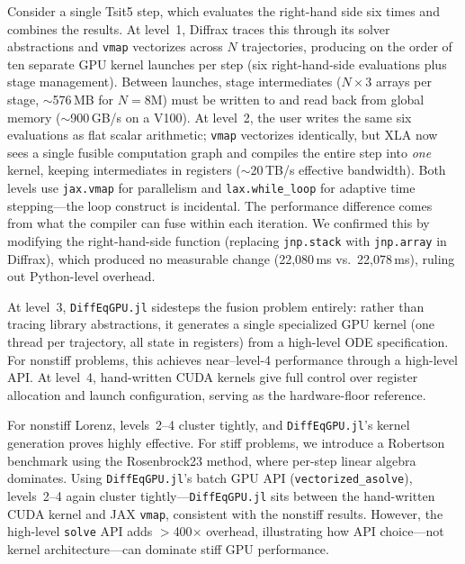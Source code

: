 \documentclass[11pt]{article}
\begin{document}
Consider a single Tsit5 step, which evaluates the right-hand side
six times and combines the results.
At level~1, Diffrax traces this through its solver abstractions
and \texttt{vmap} vectorizes across $N$ trajectories, producing
on the order of ten separate GPU kernel launches per step
(six right-hand-side evaluations plus stage management).
Between launches, stage intermediates ($N \times 3$ arrays per
stage, ${\sim}$576\,MB for $N = 8\text{M}$) must be written to
and read back from global memory (${\sim}$900\,GB/s on a V100).
At level~2, the user writes the same six evaluations as flat
scalar arithmetic; \texttt{vmap} vectorizes identically, but XLA
now sees a single fusible computation graph and compiles the
entire step into \emph{one} kernel, keeping intermediates in
registers (${\sim}$20\,TB/s effective bandwidth).
Both levels use \texttt{jax.vmap} for parallelism and
\texttt{lax.while\_loop} for adaptive time stepping---the loop
construct is incidental.
The performance difference comes from what the compiler can fuse
within each iteration.
We confirmed this by modifying the right-hand-side function
(replacing \texttt{jnp.stack} with \texttt{jnp.array} in Diffrax),
which produced no measurable change (22{,}080\,ms vs.\
22{,}078\,ms), ruling out Python-level overhead.

At level~3, \texttt{DiffEqGPU.jl} sidesteps the fusion problem
entirely: rather than tracing library abstractions, it generates a
single specialized GPU kernel (one thread per trajectory, all
state in registers) from a high-level ODE specification.
For nonstiff problems, this achieves near--level-4 performance
through a high-level API.
At level~4, hand-written CUDA kernels give full control over
register allocation and launch configuration, serving as the
hardware-floor reference.

For nonstiff Lorenz, levels~2--4 cluster tightly, and
\texttt{DiffEqGPU.jl}'s kernel generation proves highly effective.
For stiff problems, we introduce a Robertson benchmark using
the Rosenbrock23 method, where per-step linear algebra
dominates.
Using \texttt{DiffEqGPU.jl}'s batch GPU API
(\texttt{vectorized\_asolve}), levels~2--4 again cluster
tightly---\texttt{DiffEqGPU.jl} sits between the hand-written
CUDA kernel and JAX \texttt{vmap}, consistent with the nonstiff
results.
However, the high-level \texttt{solve} API adds $>$400$\times$
overhead, illustrating how API choice---not kernel
architecture---can dominate stiff GPU performance.

\end{document}
